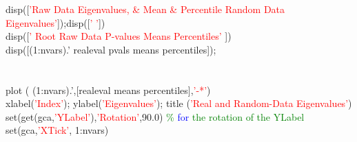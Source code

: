 \hspace{1mm}\indent \indent \indent \indent \indent \indent \indent \indent \indent \indent \indent \indent \indent \indent \indent disp([\textcolor{red}{'Raw Data Eigenvalues, \& Mean \& Percentile Random Data Eigenvalues'}]);disp([\textcolor{red}{' '}]) \\ 
\hspace{1mm}\indent \indent \indent \indent \indent \indent \indent \indent \indent \indent \indent \indent \indent \indent \indent disp([\textcolor{red}{'      Root   Raw Data   P-values    Means   Percentiles'} ]) \\ 
\hspace{1mm}\indent \indent \indent \indent \indent \indent \indent \indent \indent \indent \indent \indent \indent \indent \indent disp([(1:nvars).'  realeval  pvals means  percentiles]); \\ 
\hspace{1mm}\indent \indent \indent \indent \indent \indent \indent \indent \indent \indent \indent \indent \indent \indent \indent  \\ 
\hspace{1mm}\indent \indent \indent \indent \indent \indent \indent \indent \indent \indent \indent \indent \indent \indent \indent  \\ 
\hspace{1mm}\indent \indent \indent \indent \indent \indent \indent \indent \indent \indent \indent \indent \indent \indent \indent plot ( (1:nvars).',[realeval means  percentiles],\textcolor{red}{'-*'}) \\ 
\hspace{1mm}\indent \indent \indent \indent \indent \indent \indent \indent \indent \indent \indent \indent \indent \indent \indent xlabel(\textcolor{red}{'Index'}); ylabel(\textcolor{red}{'Eigenvalues'}); title (\textcolor{red}{'Real and Random-Data Eigenvalues'}) \\ 
\hspace{1mm}\indent \indent \indent \indent \indent \indent \indent \indent \indent \indent \indent \indent \indent \indent \indent set(get(gca,\textcolor{red}{'YLabel'}),\textcolor{red}{'Rotation'},90.0) \textcolor{green}{\% \textcolor{blue}{for} the rotation of the YLabel }\\ 
\hspace{1mm}\indent \indent \indent \indent \indent \indent \indent \indent \indent \indent \indent \indent \indent \indent \indent \indent set(gca,\textcolor{red}{'XTick'}, 1:nvars) \\ 
